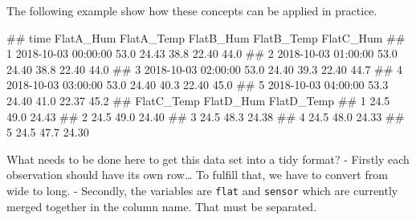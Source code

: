 \documentclass[
  a4paperpaper,
]{book}
\newenvironment{Shaded}{\begin{snugshade}}{\end{snugshade}}
\newcommand{\CommentTok}[1]{\textcolor[rgb]{0.56,0.35,0.01}{\textit{#1}}}
\newcommand{\DataTypeTok}[1]{\textcolor[rgb]{0.13,0.29,0.53}{#1}}
\newcommand{\DecValTok}[1]{\textcolor[rgb]{0.00,0.00,0.81}{#1}}
\newcommand{\KeywordTok}[1]{\textcolor[rgb]{0.13,0.29,0.53}{\textbf{#1}}}
\newcommand{\NormalTok}[1]{#1}
\newcommand{\OperatorTok}[1]{\textcolor[rgb]{0.81,0.36,0.00}{\textbf{#1}}}
\newcommand{\OtherTok}[1]{\textcolor[rgb]{0.56,0.35,0.01}{#1}}
\newcommand{\StringTok}[1]{\textcolor[rgb]{0.31,0.60,0.02}{#1}}
\let\oldShaded\Shaded
\let\endoldShaded\endShaded
\renewenvironment{Shaded}{\footnotesize\oldShaded}{\endoldShaded}
\let\oldverbatim\verbatim
\let\endoldverbatim\endverbatim
\renewenvironment{verbatim}{\footnotesize\oldverbatim}{\endoldverbatim}
\begin{document}
The following example show how these concepts can be applied in practice.

\begin{Shaded}
\end{Shaded}

\begin{verbatim}
##                  time FlatA_Hum FlatA_Temp FlatB_Hum FlatB_Temp FlatC_Hum
## 1 2018-10-03 00:00:00      53.0      24.43      38.8      22.40      44.0
## 2 2018-10-03 01:00:00      53.0      24.40      38.8      22.40      44.0
## 3 2018-10-03 02:00:00      53.0      24.40      39.3      22.40      44.7
## 4 2018-10-03 03:00:00      53.0      24.40      40.3      22.40      45.0
## 5 2018-10-03 04:00:00      53.3      24.40      41.0      22.37      45.2
##   FlatC_Temp FlatD_Hum FlatD_Temp
## 1       24.5      49.0      24.43
## 2       24.5      49.0      24.40
## 3       24.5      48.3      24.38
## 4       24.5      48.0      24.33
## 5       24.5      47.7      24.30
\end{verbatim}

What needs to be done here to get this data set into a tidy format?
- Firstly each observation should have its own row\ldots{} To fulfill that, we have to convert from wide to long.
- Secondly, the variables are \texttt{flat} and \texttt{sensor} which are currently merged together in the column name. That must be separated.
\end{document}
